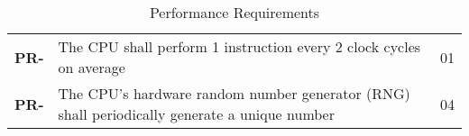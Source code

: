 \resetfyshcounter
\newcommand{\pr}[2]{
	\textbf{PR-\rc} & #1 & #2 \\
	\hline
}
\begin{table}[H]
	\begin{tabularx}{\textwidth}{| a | x | a |}
		\hline
		 &  &  \\
		\hline
		\pr{The CPU shall perform 1 instruction every 2 clock cycles on average}%
		{01}

		\pr{The CPU's hardware random number generator (RNG) shall periodically generate a unique number}%
		{04}

	\end{tabularx}
	\caption{Performance Requirements}
\end{table}

